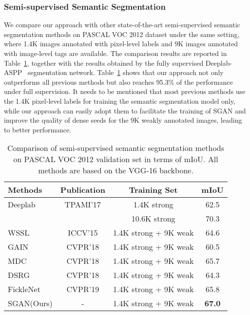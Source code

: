 \documentclass[journal]{IEEEtran}
\begin{document}
\subsubsection{Semi-supervised Semantic Segmentation}
We compare our approach with other state-of-the-art semi-supervised semantic segmentation methods on PASCAL VOC 2012 dataset under the same setting, where 1.4K images annotated with pixel-level labels and 9K images annotated with image-level tags are available. The comparison results are reported in Table~\ref{tab:comp_semi}, together with the results obtained by the fully supervised Deeplab-ASPP~\cite{chen2017deeplab} segmentation network. Table~\ref{tab:comp_semi} shows that our approach not only outperforms all previous methods but also reaches 95.3\% of the performance under full supervision. It needs to be mentioned that most previous methods use the 1.4K pixel-level labels for training the semantic segmentation model only, while our approach can easily adopt them to facilitate the training of SGAN and improve the quality of dense seeds for the 9K weakly annotated images, leading to better performance.

\begin{table}[htbp]
	\begin{minipage}{1\linewidth}
		\centering
		\caption{Comparison of semi-supervised semantic segmentation methods on PASCAL VOC 2012 validation set in terms of mIoU. All methods are based on the VGG-16 backbone.} \label{tab:comp_semi}
		\begin{tabular}{l|c|c|c}
			\hline
			Methods   							&Publication	&Training Set   		&mIoU \\ \hline
			Deeplab~\cite{chen2017deeplab}  	&TPAMI'17		&1.4K strong 			&62.5 \\ 
			& 			 	&10.6K strong 			&70.3 \\ \hline			
			WSSL~\cite{papandreou2015weakly} 	&ICCV'15		&1.4K strong + 9K weak 	&64.6 \\
			GAIN~\cite{li2018tell} 				&CVPR'18		&1.4K strong + 9K weak 	&60.5 \\
			MDC~\cite{wei2018revisiting} 		&CVPR'18		&1.4K strong + 9K weak 	&65.7 \\
			DSRG~\cite{huang2018weakly} 		&CVPR'18		&1.4K strong + 9K weak 	&64.3 \\
			FickleNet~\cite{lee2019ficklenet} 	&CVPR'19		&1.4K strong + 9K weak 	&65.8 \\
			SGAN(Ours)  						&-				&1.4K strong + 9K weak 	&\textbf{67.0} \\ \hline
		\end{tabular}
	\end{minipage}
\end{table}
\end{document}
